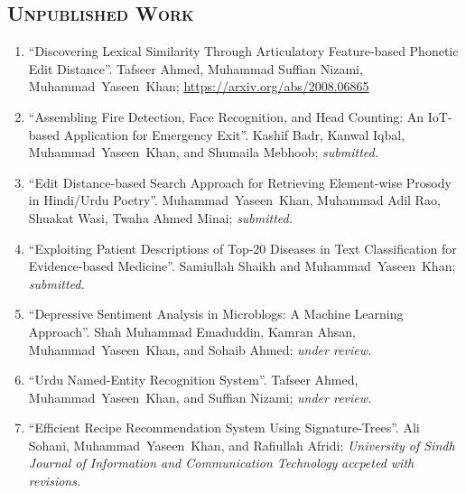 \documentclass[a4paper, 10pt]{article}
\begin{document}
\subsection*{\normalfont\textsc{ Unpublished Work}}
\begin{enumerate}
\itemsep-4pt 

	\item ``Discovering Lexical Similarity Through Articulatory Feature-based Phonetic Edit Distance''. Tafseer Ahmed, Muhammad Suffian Nizami, \textcolor{NavyBlue}{Muhammad~Yaseen~Khan}; \url{https://arxiv.org/abs/2008.06865}
	
	\item ``Assembling Fire Detection, Face Recognition, and Head Counting: An IoT-based Application for Emergency Exit''. Kashif Badr, Kanwal Iqbal, \textcolor{NavyBlue}{Muhammad~Yaseen~Khan}, and Shumaila Mebhoob; \emph{\small submitted.}

	\item ``Edit Distance-based Search Approach for Retrieving  Element-wise Prosody in Hindi/Urdu Poetry''. \textcolor{NavyBlue}{Muhammad~Yaseen~Khan}, Muhammad Adil Rao, Shuakat Wasi, Twaha Ahmed Minai; \emph{\small submitted.}
	
	\item ``Exploiting Patient Descriptions of Top-20 Diseases in Text Classification for Evidence-based Medicine''. Samiullah Shaikh and \textcolor{NavyBlue}{Muhammad~Yaseen~Khan}; \emph{\small submitted.}

	\item ``Depressive Sentiment Analysis in Microblogs: A Machine Learning Approach''. Shah Muhammad Emaduddin, Kamran Ahsan, \textcolor{NavyBlue}{Muhammad~Yaseen~Khan}, and Sohaib Ahmed; \emph{\small under review.}
	
	\item ``Urdu Named-Entity Recognition System''. Tafseer Ahmed, \textcolor{NavyBlue}{Muhammad~Yaseen~Khan}, and Suffian Nizami; \emph{\small under review.}
	
	\item ``Efficient Recipe Recommendation System Using Signature-Trees''. Ali Sohani, \textcolor{NavyBlue}{Muhammad~Yaseen~Khan}, and Rafiullah Afridi; \emph{University of Sindh Journal of Information and Communication Technology} \emph{\small accpeted with revisions.}


\end{enumerate}
\end{document}
